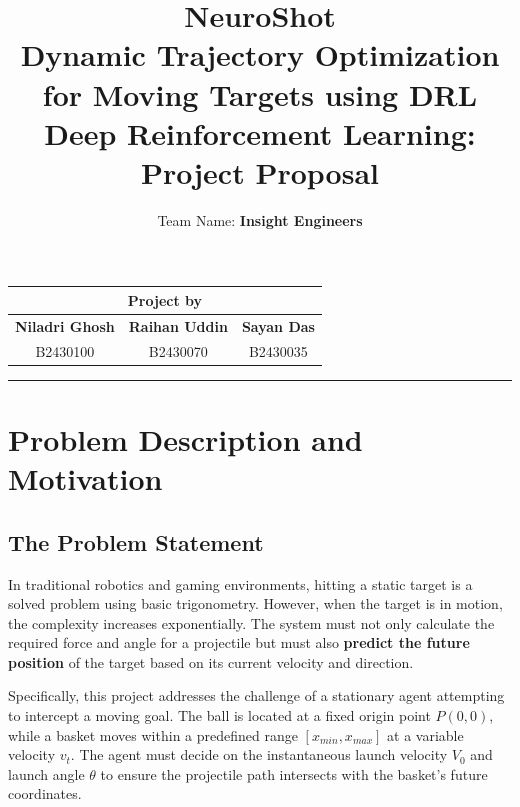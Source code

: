 \documentclass[a4paper,11pt,notitlepage]{report}
\title{
    \textbf{\Huge NeuroShot} \\
    \Large Dynamic Trajectory Optimization for Moving Targets using DRL \\
    \vspace{0.5cm}
    \normalsize Deep Reinforcement Learning: Project Proposal
}
\author{Team Name: \textbf{Insight Engineers}}
\date{}
\begin{document}
\fontsize{11}{15}\selectfont

\maketitle

\vspace{-1cm}
\begin{center}
    \begin{tabular*}{0.85\textwidth}{@{\extracolsep{\fill}}ccc}
        \multicolumn{3}{c}{\large Project by} \\ [0.5ex] %
        \midrule %
        \textbf{Niladri Ghosh} & \textbf{Raihan Uddin} & \textbf{Sayan Das} \\
        B2430100 & B2430070 & B2430035 \\
    \end{tabular*}
\end{center}
\hrule

\section*{Problem Description and Motivation}

\subsection*{The Problem Statement}
In traditional robotics and gaming environments, hitting a static target is a solved problem using basic trigonometry. However, when the target is in motion, the complexity increases exponentially. The system must not only calculate the required force and angle for a projectile but must also \textbf{predict the future position} of the target based on its current velocity and direction.

Specifically, this project addresses the challenge of a stationary agent attempting to intercept a moving goal. The ball is located at a fixed origin point $P(0,0)$, while a basket moves within a predefined range $[x_{min}, x_{max}]$ at a variable velocity $v_t$. The agent must decide on the instantaneous launch velocity $V_0$ and launch angle $\theta$ to ensure the projectile path intersects with the basket's future coordinates.
\end{document}
